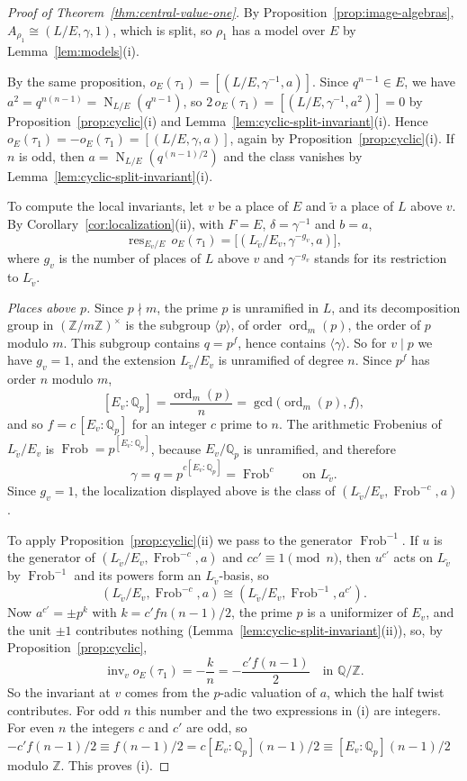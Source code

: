 \documentclass[a4paper,11pt]{amsart}
\theoremstyle{definition}
\theoremstyle{remark}
\numberwithin{equation}{section}
\newcommand{\Q}{\mathbb{Q}}
\newcommand{\Z}{\mathbb{Z}}
\DeclareMathOperator{\inv}{inv}
\DeclareMathOperator{\res}{res}
\DeclareMathOperator{\Frob}{Frob}
\DeclareMathOperator{\Nm}{N}
\DeclareMathOperator{\ord}{ord}
\begin{document}
\begin{proof}[Proof of Theorem~\ref{thm:central-value-one}]
By Proposition~\ref{prop:image-algebras}, $A_{\rho_1}\cong(L/E,\gamma,1)$, which is split, so $\rho_1$ has a model over $E$ by Lemma~\ref{lem:models}(i).

By the same proposition, $o_E(\tau_1)=[(L/E,\gamma^{-1},a)]$. Since $q^{n-1}\in E$, we have $a^2=q^{n(n-1)}=\Nm_{L/E}(q^{n-1})$, so $2\,o_E(\tau_1)=[(L/E,\gamma^{-1},a^2)]=0$ by Proposition~\ref{prop:cyclic}(i) and Lemma~\ref{lem:cyclic-split-invariant}(i). Hence $o_E(\tau_1)=-o_E(\tau_1)=[(L/E,\gamma,a)]$, again by Proposition~\ref{prop:cyclic}(i). If $n$ is odd, then $a=\Nm_{L/E}(q^{(n-1)/2})$ and the class vanishes by Lemma~\ref{lem:cyclic-split-invariant}(i).

To compute the local invariants, let $v$ be a place of $E$ and $\tilde v$ a place of $L$ above $v$. By Corollary~\ref{cor:localization}(ii), with $F=E$, $\delta=\gamma^{-1}$ and $b=a$,
\[
 \res_{E_v/E}\,o_E(\tau_1)=\bigl[(L_{\tilde v}/E_v,\gamma^{-g_v},a)\bigr],
\]
where $g_v$ is the number of places of $L$ above $v$ and $\gamma^{-g_v}$ stands for its restriction to $L_{\tilde v}$.

\emph{Places above $p$.} Since $p\nmid m$, the prime $p$ is unramified in $L$, and its decomposition group in $(\Z/m\Z)^\times$ is the subgroup $\langle p\rangle$, of order $\ord_m(p)$, the order of $p$ modulo $m$. This subgroup contains $q=p^f$, hence contains $\langle\gamma\rangle$. So for $v\mid p$ we have $g_v=1$, and the extension $L_{\tilde v}/E_v$ is unramified of degree $n$. Since $p^f$ has order $n$ modulo $m$,
\[
 [E_v:\Q_p]=\frac{\ord_m(p)}n=\gcd\bigl(\ord_m(p),f\bigr),
\]
and so $f=c\,[E_v:\Q_p]$ for an integer $c$ prime to $n$. The arithmetic Frobenius of $L_{\tilde v}/E_v$ is $\Frob=p^{[E_v:\Q_p]}$, because $E_v/\Q_p$ is unramified, and therefore
\[
 \gamma=q=p^{c[E_v:\Q_p]}=\Frob^c\qquad\text{on }L_{\tilde v}.
\]
Since $g_v=1$, the localization displayed above is the class of $(L_{\tilde v}/E_v,\Frob^{-c},a)$.

To apply Proposition~\ref{prop:cyclic}(ii) we pass to the generator $\Frob^{-1}$. If $u$ is the generator of $(L_{\tilde v}/E_v,\Frob^{-c},a)$ and $cc'\equiv1\pmod n$, then $u^{c'}$ acts on $L_{\tilde v}$ by $\Frob^{-1}$ and its powers form an $L_{\tilde v}$-basis, so
\[
 (L_{\tilde v}/E_v,\Frob^{-c},a)\cong(L_{\tilde v}/E_v,\Frob^{-1},a^{c'}).
\]
Now $a^{c'}=\pm p^k$ with $k=c'fn(n-1)/2$, the prime $p$ is a uniformizer of $E_v$, and the unit $\pm1$ contributes nothing (Lemma~\ref{lem:cyclic-split-invariant}(ii)), so, by Proposition~\ref{prop:cyclic},
\[
 \inv_v o_E(\tau_1)=-\frac kn=-\frac{c'f(n-1)}2\quad\text{in }\Q/\Z.
\]
So the invariant at $v$ comes from the $p$-adic valuation of $a$, which the half twist contributes. For odd $n$ this number and the two expressions in (i) are integers. For even $n$ the integers $c$ and $c'$ are odd, so $-c'f(n-1)/2\equiv f(n-1)/2=c[E_v:\Q_p](n-1)/2\equiv[E_v:\Q_p](n-1)/2$ modulo $\Z$. This proves (i).


\end{proof}
\end{document}
